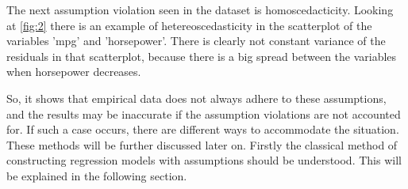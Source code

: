 \noindent The next assumption violation seen in the dataset is homoscedacticity. Looking at \autoref{fig:2} there is an example of hetereoscedasticity in the scatterplot of the variables 'mpg' and 'horsepower'. There is clearly not constant variance of the residuals in that scatterplot, because there is a big spread between the variables when horsepower decreases. \newline

\noindent So, it shows that empirical data does not always adhere to these assumptions, and the results may be inaccurate if the assumption violations are not accounted for. If such a case occurs, there are different ways to accommodate the situation. These methods will be further discussed later on. Firstly the classical method of constructing regression models with assumptions should be understood. This will be explained in the following section.\newline

 

